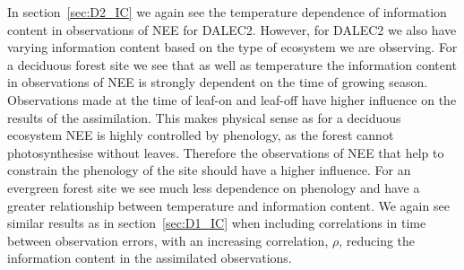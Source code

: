 \documentclass[11pt]{article}
\begin{document}
In section~\ref{sec:D2_IC} we again see the temperature dependence of information content in observations of NEE for DALEC2. However, for DALEC2 we also have varying information content based on the type of ecosystem we are observing. For a deciduous forest site we see that as well as temperature the information content in observations of NEE is strongly dependent on the time of growing season. Observations made at the time of leaf-on and leaf-off have higher influence on the results of the assimilation. This makes physical sense as for a deciduous ecosystem NEE is highly controlled by phenology, as the forest cannot photosynthesise without leaves. Therefore the observations of NEE that help to constrain the phenology of the site should have a higher influence. For an evergreen forest site we see much less dependence on phenology and have a greater relationship between temperature and information content. We again see similar results as in section~\ref{sec:D1_IC} when including correlations in time between observation errors, with an increasing correlation, \(\rho\), reducing the information content in the assimilated observations.

{}
\end{document}
